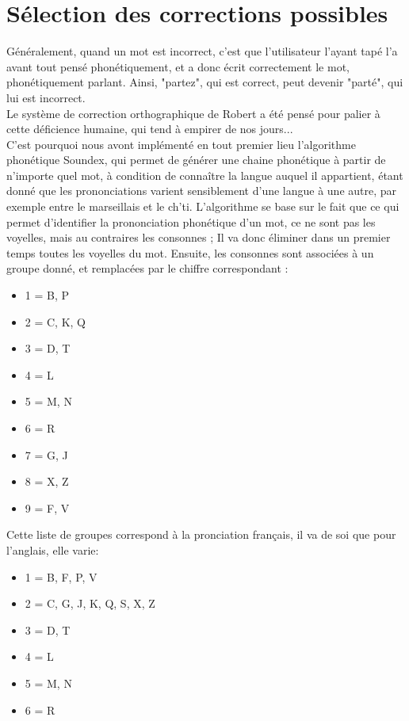 \section{Sélection des corrections possibles}
Généralement, quand un mot est incorrect, c'est que l'utilisateur l'ayant tapé l'a avant tout pensé phonétiquement, et a donc écrit correctement le mot,
phonétiquement parlant. Ainsi, "partez", qui est correct, peut devenir "parté", qui lui est incorrect.\\
Le système de correction orthographique de Robert a été pensé pour palier à cette déficience humaine, qui tend à empirer de nos jours...\\
C'est pourquoi nous avont implémenté en tout premier lieu l'algorithme phonétique Soundex, qui permet de générer une chaine phonétique à partir de n'importe
quel mot, à condition de connaître la langue auquel il appartient, étant donné que les prononciations varient sensiblement d'une langue à une autre, par exemple
entre le marseillais et le ch'ti.
L'algorithme se base sur le fait que ce qui permet d'identifier la prononciation phonétique d'un mot, ce ne sont pas les voyelles, mais au contraires les consonnes ;
Il va donc éliminer dans un premier temps toutes les voyelles du mot. Ensuite, les consonnes sont associées à un groupe donné, et remplacées par le chiffre correspondant :\\
\begin{itemize}
	\item 1 = B, P
	\item 2 = C, K, Q
	\item 3 = D, T
	\item 4 = L
	\item 5 = M, N
	\item 6 = R
	\item 7 = G, J
	\item 8 = X, Z
	\item 9 = F, V
\end{itemize}
Cette liste de groupes correspond à la pronciation français, il va de soi que pour l'anglais, elle varie: \\
\begin{itemize}
	\item 1 = B, F, P, V
	\item 2 = C, G, J, K, Q, S, X, Z
	\item 3 = D, T
	\item 4 = L
	\item 5 = M, N
	\item 6 = R
\end{itemize}
